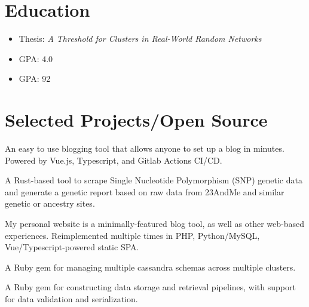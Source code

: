 \documentclass[11pt,a4paper,sans]{moderncv}
\begin{document}
\section{\textbf{Education}}

{ \begin{itemize} \itemsep -1pt
  \item Thesis: \textit{A Threshold for Clusters in Real-World Random Networks}\item GPA: 4.0
\end{itemize} }

{ \begin{itemize} \itemsep -1pt
  \item GPA: 92
\end{itemize} }

\section{\textbf{Selected Projects/Open Source}}

  {An easy to use blogging tool that allows anyone to set up a blog in minutes. Powered by Vue.js, Typescript, and Gitlab Actions CI/CD.}

  {A Rust-based tool to scrape Single Nucleotide Polymorphism (SNP) genetic data and generate a genetic report based on raw data from 23AndMe and similar genetic or ancestry sites.}

  {My personal website is a minimally-featured blog tool, as well as other web-based experiences. Reimplemented multiple times in PHP, Python/MySQL, Vue/Typescript-powered static SPA.}

  {A Ruby gem for managing multiple cassandra schemas across multiple clusters.}

  {A Ruby gem for constructing data storage and retrieval pipelines, with support for data validation and serialization.}
\end{document}
